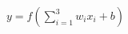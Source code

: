 \documentclass[preview]{standalone}
\begin{document}
\begin{align*}
y = f\left(\sum_{i=1}^{3} w_i x_i + b\right)
\end{align*}
\end{document}
